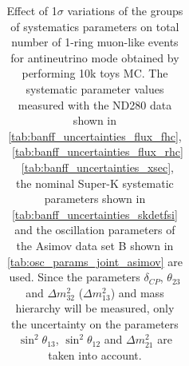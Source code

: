 \begin{table}[htb]
\begin{tabular}{| c | c | c |}
\end{tabular}
\caption{
 Effect of 1$\sigma$ variations of the groups of systematics parameters on total number of
 1-ring muon-like events for antineutrino mode obtained by performing 10k toys MC.
The systematic parameter values measured with the ND280 data 
shown in 
\cref{tab:banff_uncertainties_flux_fhc},
~\ref{tab:banff_uncertainties_flux_rhc}
~\ref{tab:banff_uncertainties_xsec},
the nominal Super-K systematic parameters shown in \cref{tab:banff_uncertainties_skdetfsi}
and the oscillation parameters of the Asimov data set B shown in \cref{tab:osc_params_joint_asimov}
are used.
Since the parameters $\delta_{CP}$, $\theta_{23}$ and $\Delta m^2_{32}$ ($\Delta m^2_{13}$) and mass hierarchy
will be measured,
only the uncertainty on the parameters 
$\sin^2 \theta_{13}$,
$\sin^2 \theta_{12}$
and 
$\Delta m^2_{21}$ 
are taken into account.
}                                                                                                                                                                                          
\label{tab:nsk_systematic_table_summary_joint_asimov_B_rhc_mulike_Run17b}
\end{table}




